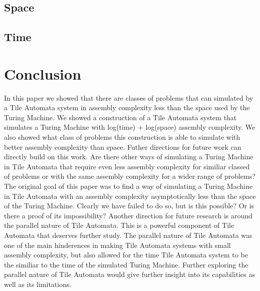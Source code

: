 \documentclass{article}
\begin{document}
\subsection{Space}

\subsection{Time}

\section{Conclusion}
In this paper we showed that there are classes of problems that can simulated by a Tile Automata
system in assembly complexity less than the space used by the Turing Machine.  We showed a
construction of a Tile Automata system that simulates a Turing Machine with log(time) + log(space)
assembly complexity.  We also showed what class of problems this construction is able to simulate
with better assembly complexity than space.  Futher directions for future work can directly build
on this work.  Are there other ways of simulating a Turing Machine in Tile Automata that require
even less assembly complexity for similiar classed of problems or with the same assembly complexity
for a wider range of problems?  The original goal of this paper was to find a way of simulating
a Turing Machine in Tile Automata with an assembly complexity asymptotically less than the space of
the Turing Machine.  Clearly we have failed to do so, but is this possible?  Or is there a proof
of its impossibility?  Another direction for future research is around the parallel nature of
Tile Automata.  This is a powerful component of Tile Automata that deserves further study.  The
parallel nature of Tile Automata was one of the main hinderences in making Tile Automata systems
with small assembly complexity, but also allowed for the time Tile Automata system to be the
similiar to the time of the simulated Turing Machine.  Further exploring the parallel nature of
Tile Automata would give further insight into its capabilities as well as its limitations.


 

\end{document}
